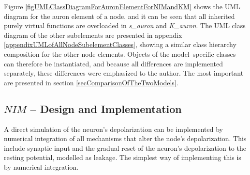 		Figure \ref{figUMLClassDiagramForAuronElementForNIMandKM} shows the UML diagram for the auron element of a node, and it can be seen that all inherited purely virtual functions are overloaded in \emph{s\_auron} and \emph{K\_auron}.
		The UML class diagram of the other subelements are presented in appendix \ref{appendixUMLofAllNodeSubelementClasses}, showing a similar class hierarchy composition for the other node elements. %
		Objects of the model--specific classes can therefore be instantiated, and because all differences are implemented separately, these differences were emphasized to the author.
		The most important are presented in section \ref{secComparisonOfTheTwoModels}.



	\subsection{$NIM$ -- Design and Implementation}
		A direct simulation of the neuron's depolarization can be implemented by numerical integration of all mechanisms that alter the node's depolarization.
		This include synaptic input and the gradual reset of the neuron's depolarization to the resting potential, modelled as leakage.
		The simplest way of implementing this is by numerical integration.

